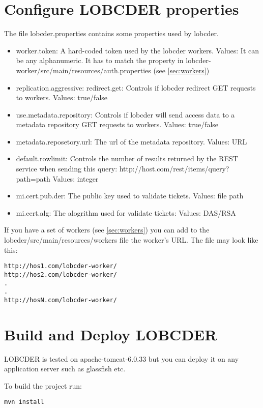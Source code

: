 \documentclass[a4paper,10pt]{article}
\begin{document}
\section{Configure LOBCDER properties}\label{sec:lobProp}
The file lobcder.properties contains some properties used by lobcder. 

\begin{itemize}
 \item worker.token: A hard-coded token used by the lobcder workers. Values: It can be any alphanumeric. It has to match the property in lobcder-worker/src/main/resources/auth.properties (see \ref{sec:workers})
 \item replication.aggressive: 
 \itam redirect.get: Controls if lobcder redirect GET requests to workers. Values: true/false
 \item use.metadata.repository: Controls if lobcder will send access data to a metadata repository GET requests to workers. Values: true/false
 \item metadata.reposetory.url: The url of the metadata repository. Values: URL 
 \item default.rowlimit: Controls the number of results returned by the REST service when sending this query: http://host.com/rest/items/query?path={path} Values: integer
  \item mi.cert.pub.der: The public key used to validate tickets. Values: file path 
  \item mi.cert.alg: The alogrithm used for validate tickets:  Values: DAS/RSA
\end{itemize}


If you have a set of workers (see \ref{sec:workers}) you can add to the lobcder/src/main/resources/workers file the worker's URL. The file may look like this:

\begin{lstlisting}
http://hos1.com/lobcder-worker/
http://hos2.com/lobcder-worker/
.
.
http://hosN.com/lobcder-worker/
\end{lstlisting}


\section{Build and Deploy LOBCDER}
LOBCDER is tested on apache-tomcat-6.0.33 but you can deploy it on any application server such as glassfish etc. 

To build the project run:
\begin{lstlisting}
mvn install
\end{lstlisting}
\end{document}
